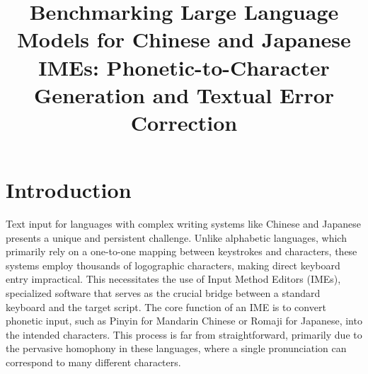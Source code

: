 \documentclass[10pt, a4paper]{article}
\title{Benchmarking Large Language Models for Chinese and Japanese IMEs: Phonetic-to-Character Generation and Textual Error Correction}
\begin{document}
\maketitleabstract


\section{Introduction}
Text input for languages with complex writing systems like Chinese and Japanese presents a unique and persistent challenge. Unlike alphabetic languages, which primarily rely on a one-to-one mapping between keystrokes and characters, these systems employ thousands of logographic characters, making direct keyboard entry impractical. This necessitates the use of Input Method Editors (IMEs), specialized software that serves as the crucial bridge between a standard keyboard and the target script. The core function of an IME is to convert phonetic input, such as Pinyin for Mandarin Chinese or Romaji for Japanese, into the intended characters. This process is far from straightforward, primarily due to the pervasive homophony in these languages, where a single pronunciation can correspond to many different characters.


\end{document}
